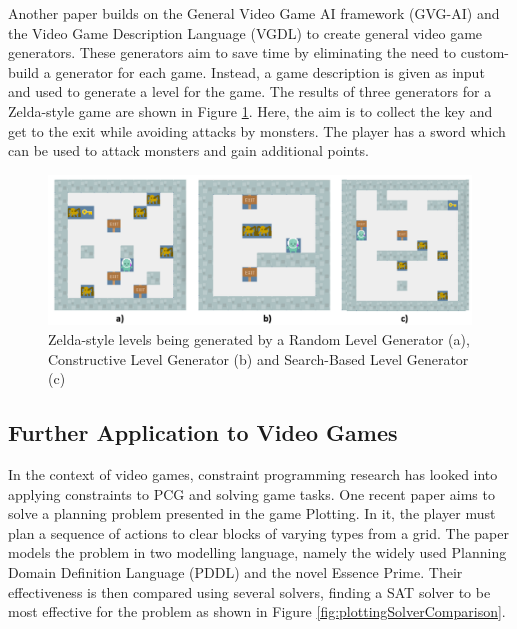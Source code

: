 Another paper \cite{GVG-AI_and_VGDL_Level_Generators} builds on the General Video Game AI framework (GVG-AI) and the Video Game Description Language (VGDL) to create general video game generators. These generators aim to save time by eliminating the need to custom-build a generator for each game. Instead, a game description is given as input and used to generate a level for the game. The results of three generators for a Zelda-style game are shown in Figure \ref{fig:gvgAILevels}. Here, the aim is to collect the key and get to the exit while avoiding attacks by monsters. The player has a sword which can be used to attack monsters and gain additional points.

\begin{figure}[H]
    \centering
    \includegraphics[width=\textwidth, height=0.3\textheight, keepaspectratio]{Images/GVGAILevels.png}
    \caption{Zelda-style levels being generated by a Random Level Generator (a), Constructive Level Generator (b) and Search-Based Level Generator (c) \cite{GVG-AI_and_VGDL_Level_Generators}}
    \label{fig:gvgAILevels}
\end{figure}

\subsection{Further Application to Video Games}
In the context of video games, constraint programming research has looked into applying constraints to PCG and solving game tasks. One recent paper \cite{Plotting_Planning_Problem} aims to solve a planning problem presented in the game Plotting. In it, the player must plan a sequence of actions to clear blocks of varying types from a grid. The paper models the problem in two modelling language, namely the widely used Planning Domain Definition Language (PDDL) and the novel Essence Prime. Their effectiveness is then compared using several solvers, finding a SAT solver to be most effective for the problem as shown in Figure \ref{fig:plottingSolverComparison}.

